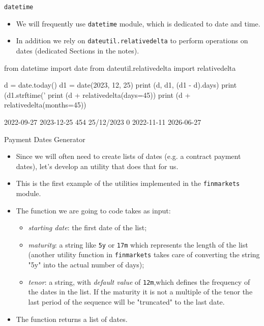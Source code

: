 \documentclass{beamer}
\begin{document}
\begin{frame}[fragile]{\texttt{datetime}}
  \begin{itemize}
  \item We will frequently use \texttt{datetime} module, which is dedicated to date and time.
  \item In addition we rely on \texttt{dateutil.relativedelta} to perform operations on dates (dedicated Sections in the notes).
  \end{itemize}
  \begin{ipython}
from datetime import date
from dateutil.relativedelta import relativedelta
		
d = date.today()
d1 = date(2023, 12, 25)
print (d, d1, (d1 - d).days)
print (d1.strftime('%
print (d + relativedelta(days=45))
print (d + relativedelta(months=45))
\end{ipython}
\begin{ioutput}
2022-09-27 2023-12-25 454
25/12/2023 0
2022-11-11
2026-06-27
\end{ioutput}
\end{frame}

\begin{frame}{Payment Dates Generator}
  \begin{itemize}
  \item Since we will often need to create lists of dates (e.g. a contract payment dates), let's develop an utility that does that for us.
  \item This is the first example of the utilities implemented in the \texttt{finmarkets} module.
  \item The function we are going to code takes as input:
    \begin{itemize}
    \item \emph{starting date}: the first date of the list;
    \item \emph{maturity}: a string like \texttt{5y} or \texttt{17m} which represents the length of the list (another utility function in \texttt{finmarkets} takes care of converting the string "5y" into the actual number of days);
    \item \emph{tenor}: a string, with \emph{default value} of \texttt{12m},which defines the frequency of the dates in the list. If the maturity it is not a multiple of the tenor the last period of the sequence will be "truncated" to the last date.
    \end{itemize}
  \item The function returns a list of dates.
  \end{itemize}		
\end{frame}
\end{document}
